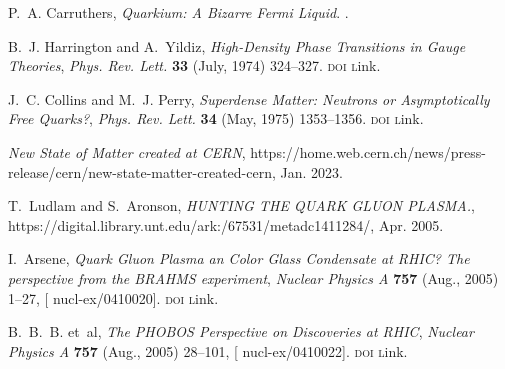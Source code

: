 \documentclass[ALICE,manyauthors]{cernphprep}
\providecommand{\DIFaddbegin}{} %
\providecommand{\DIFaddend}{} %
\providecommand{\DIFdelbegin}{} %
\providecommand{\DIFdelend}{} %
\newcommand{\DIFscaledelfig}{0.5}
\newlength{\DIFdelgraphicswidth} %
\newlength{\DIFdelgraphicsheight} %
\newcommand{\DIFaddincludegraphics}[2][]{{\color{blue}\fbox{\DIFOincludegraphics[#1]{#2}}}} %
\newcommand{\DIFdelincludegraphics}[2][]{%
\sbox{\DIFdelgraphicsbox}{\DIFOincludegraphics[#1]{#2}}%
\settoboxwidth{\DIFdelgraphicswidth}{\DIFdelgraphicsbox} %
\settoboxtotalheight{\DIFdelgraphicsheight}{\DIFdelgraphicsbox} %
\scalebox{\DIFscaledelfig}{%
\parbox[b]{\DIFdelgraphicswidth}{\usebox{\DIFdelgraphicsbox}\\[-\baselineskip] \rule{\DIFdelgraphicswidth}{0em}}\llap{\resizebox{\DIFdelgraphicswidth}{\DIFdelgraphicsheight}{%
\setlength{\unitlength}{\DIFdelgraphicswidth}%
\begin{picture}(1,1)%
\thicklines\linethickness{2pt} %
{\color[rgb]{1,0,0}\put(0,0){\framebox(1,1){}}}%
{\color[rgb]{1,0,0}\put(0,0){\line( 1,1){1}}}%
{\color[rgb]{1,0,0}\put(0,1){\line(1,-1){1}}}%
\end{picture}%
}\hspace*{3pt}}} %
} %
\DeclareRobustCommand{\DIFaddbegin}{\DIFOaddbegin \let\includegraphics\DIFaddincludegraphics} %
\DeclareRobustCommand{\DIFaddend}{\DIFOaddend \let\includegraphics\DIFOincludegraphics} %
\DeclareRobustCommand{\DIFdelbegin}{\DIFOdelbegin \let\includegraphics\DIFdelincludegraphics} %
\DeclareRobustCommand{\DIFdelend}{\DIFOaddend \let\includegraphics\DIFOincludegraphics} %
\begin{document}
\cleardoublepage %

\providecommand{\href}[2]{#2}\begingroup\raggedright\DIFdelbegin %
\DIFdelend \DIFaddbegin \begin{thebibliography}{100}
\DIFaddend 

P.~A. Carruthers, {\em Quarkium: {{A}} Bizarre {{Fermi}} Liquid}.
.

B.~J. Harrington and A.~Yildiz, {\it High-{{Density Phase Transitions}} in
  {{Gauge Theories}}},  {\textsl{Phys. Rev. Lett.}} {\footnotesize \bf 33}
  (July, 1974) 324--327.
  \href{http://dx.doi.org/10.1103/PhysRevLett.33.324}{\footnotesize
  \textrm{\textsc{doi l}ink}}.

J.~C. Collins and M.~J. Perry, {\it Superdense {{Matter}}: {{Neutrons}} or
  {{Asymptotically Free Quarks}}?},  {\textsl{Phys. Rev. Lett.}} {\footnotesize
  \bf 34} (May, 1975) 1353--1356.
  \href{http://dx.doi.org/10.1103/PhysRevLett.34.1353}{\footnotesize
  \textrm{\textsc{doi l}ink}}.

{\it New {{State}} of {{Matter}} created at {{CERN}}},
  https://home.web.cern.ch/news/press-release/cern/new-state-matter-created-cern,
  Jan. 2023.

T.~Ludlam and S.~Aronson, {\it {{HUNTING THE QUARK GLUON PLASMA}}.},
  https://digital.library.unt.edu/ark:/67531/metadc1411284/, Apr. 2005.

I.~Arsene, {\it Quark {{Gluon Plasma}} an {{Color Glass Condensate}} at
  {{RHIC}}? {{The}} perspective from the {{BRAHMS}} experiment},
  {\textsl{Nuclear Physics A}} {\footnotesize \bf 757} (Aug., 2005) 1--27,
  [\href{https://arxiv.org/abs/nucl-ex/0410020}{{\footnotesize
  nucl-ex/0410020}}].
  \href{http://dx.doi.org/10.1016/j.nuclphysa.2005.02.130}{\footnotesize
  \textrm{\textsc{doi l}ink}}.

B.~B.~B. et~{al}, {\it The {{PHOBOS Perspective}} on {{Discoveries}} at
  {{RHIC}}},  {\textsl{Nuclear Physics A}} {\footnotesize \bf 757} (Aug., 2005)
  28--101, [\href{https://arxiv.org/abs/nucl-ex/0410022}{{\footnotesize
  nucl-ex/0410022}}].
  \href{http://dx.doi.org/10.1016/j.nuclphysa.2005.03.084}{\footnotesize
  \textrm{\textsc{doi l}ink}}.


\end{thebibliography}
\end{document}
